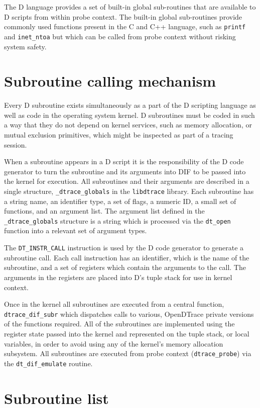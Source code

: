 The D language provides a set of built-in global sub-routines that are
available to D scripts from within probe context.  The built-in global
sub-routines provide commonly used functions present in the C and C++
language, such as \verb|printf| and \verb|inet_ntoa| but which can be
called from probe context without risking system safety.

\section{Subroutine calling mechanism}

Every D subroutine exists simultaneously as a part of the D scripting
language as well as code in the operating system kernel.  D subroutines
must be coded in such a way that they do not depend on kernel
services, such as memory allocation, or mutual exclusion primitives,
which might be inspected as part of a tracing session.

When a subroutine appears in a D script it is the responsibility of
the D code generator to turn the subroutine and its arguments into DIF
to be passed into the kernel for execution.  All subroutines and their
arguments are described in a single structure, \verb|_dtrace_globals|
in the \verb|libdtrace| library.  Each subroutine has a string name,
an identifier type, a set of flags, a numeric ID, a small set of
functions, and an argument list.  The argument list defined in the
\verb|_dtrace_globals| structure is a string which is processed via
the \verb|dt_open| function into a relevant set of argument types.

The \verb|DT_INSTR_CALL| instruction is used by the D code generator
to generate a subroutine call.  Each call instruction has an
identifier, which is the name of the subroutine, and a set of
registers which contain the arguments to the call.  The arguments in
the registers are placed into D's tuple stack for use in kernel
context.

Once in the kernel all subroutines are executed from a central
function, \verb|dtrace_dif_subr| which dispatches calls to various,
OpenDTrace private versions of the functions required.  All of the
subroutines are implemented using the register state passed into the
kernel and represented on the tuple stack, or local variables, in
order to avoid using any of the kernel's memory allocation subsystem.
All subroutines are executed from probe context (\verb|dtrace_probe|)
via the \verb|dt_dif_emulate| routine.

\section{Subroutine list}

